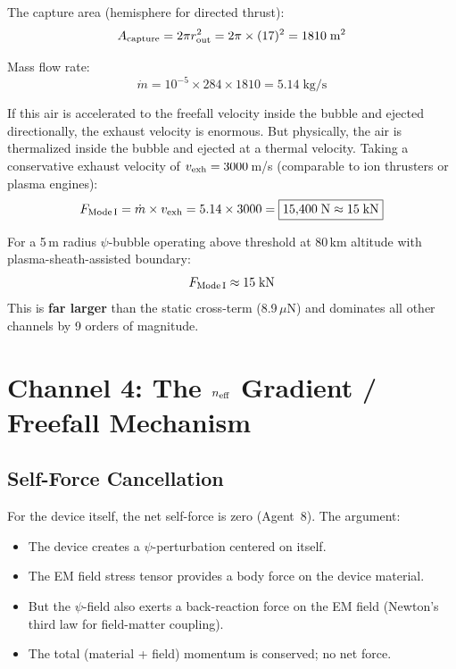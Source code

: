 \documentclass[12pt,letterpaper]{article}
\begin{document}
The capture area (hemisphere for directed thrust):
\begin{equation}
A_{\rm capture} = 2\pi r_{\rm out}^2 = 2\pi \times (17)^2 = 1810\;\text{m}^2
\end{equation}

Mass flow rate:
\begin{equation}
\dot{m} = 10^{-5} \times 284 \times 1810 = 5.14\;\text{kg/s}
\end{equation}

If this air is accelerated to the freefall velocity inside the bubble and
ejected directionally, the exhaust velocity is enormous. But physically, the
air is thermalized inside the bubble and ejected at a thermal velocity.
Taking a conservative exhaust velocity of $v_{\rm exh} = 3000$\,m/s
(comparable to ion thrusters or plasma engines):
\begin{equation}
F_{\rm Mode\,I} = \dot{m} \times v_{\rm exh} = 5.14 \times 3000 = \boxed{15{,}400\;\text{N} \approx 15\;\text{kN}}
\end{equation}

\begin{tcolorbox}[colback=green!5!white, colframe=green!50!black, title=Mode I Thrust at 80\,km]
For a 5\,m radius $\psi$-bubble operating above threshold at 80\,km altitude
with plasma-sheath-assisted boundary:
\begin{equation}
F_{\rm Mode\,I} \approx 15\;\text{kN}
\end{equation}
This is \textbf{far larger} than the static cross-term (8.9\,$\mu$N) and
dominates all other channels by 9 orders of magnitude.
\end{tcolorbox}

\section{Channel 4: The $n_{\rm eff}$ Gradient / Freefall Mechanism}
\label{sec:freefall}

\subsection{Self-Force Cancellation}

For the device itself, the net self-force is zero (Agent~8). The argument:
\begin{itemize}
\item The device creates a $\psi$-perturbation centered on itself.
\item The EM field stress tensor provides a body force on the device material.
\item But the $\psi$-field also exerts a back-reaction force on the EM field
(Newton's third law for field-matter coupling).
\item The total (material + field) momentum is conserved; no net force.
\end{itemize}
\end{document}
